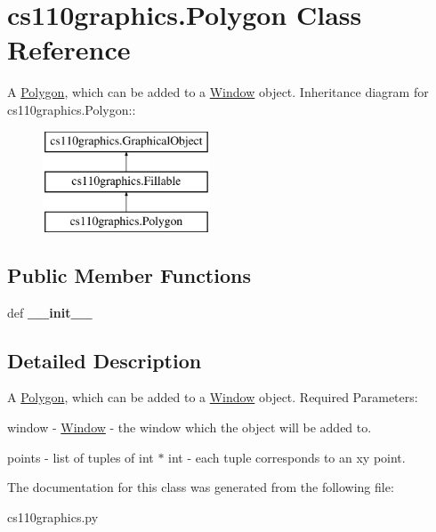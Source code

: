 \hypertarget{classcs110graphics_1_1Polygon}{
\section{cs110graphics.Polygon Class Reference}
\label{classcs110graphics_1_1Polygon}
}


A \hyperlink{classcs110graphics_1_1Polygon}{Polygon}, which can be added to a \hyperlink{classcs110graphics_1_1Window}{Window} object.  
Inheritance diagram for cs110graphics.Polygon::\begin{figure}[H]
\begin{center}
\leavevmode
\includegraphics[height=3cm]{classcs110graphics_1_1Polygon}
\end{center}
\end{figure}
\subsection*{Public Member Functions}
\begin{DoxyCompactItemize}
\item 
\hypertarget{classcs110graphics_1_1Polygon_ab471e73072b87896eec42f385102c800}{
def {\bfseries \_\-\_\-init\_\-\_\-}}
\label{classcs110graphics_1_1Polygon_ab471e73072b87896eec42f385102c800}

\end{DoxyCompactItemize}


\subsection{Detailed Description}
A \hyperlink{classcs110graphics_1_1Polygon}{Polygon}, which can be added to a \hyperlink{classcs110graphics_1_1Window}{Window} object. Required Parameters:
\begin{DoxyItemize}
\item window -\/ \hyperlink{classcs110graphics_1_1Window}{Window} -\/ the window which the object will be added to.
\item points -\/ list of tuples of int $\ast$ int -\/ each tuple corresponds to an xy point. 
\end{DoxyItemize}

The documentation for this class was generated from the following file:\begin{DoxyCompactItemize}
\item 
cs110graphics.py\end{DoxyCompactItemize}
